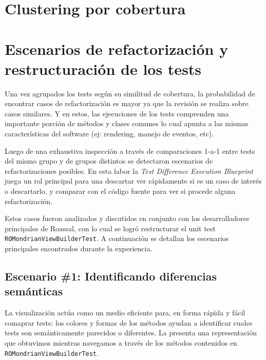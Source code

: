 \par 
{}

\section{Clustering por cobertura}

\par 

\section{Escenarios de refactorización y restructuración de los tests}

\par Una vez agrupados los tests según su similitud de cobertura, la probabilidad de encontrar casos de refactorización es mayor ya que la revisión se realiza sobre casos similares. Y en estos, las ejecuciones de los tests comprenden una importante porción de métodos y clases comunes lo cual apunta a las mismas características del software (ej: rendering, manejo de eventos, etc). 

\par Luego de una exhaustiva inspección a través de comparaciones 1-a-1 entre tests del mismo grupo y de grupos distintos se detectaron escenarios de refactorizaciones posibles. En esta labor la \emph{Test Difference Execution Blueprint} juega un rol principal para una descartar ver rápidamente si es un caso de interés o descartarlo, y comparar con el código fuente para ver si procede alguna refactorización.

\par Estos casos fueron analizados y discutidos en conjunto con los desarrolladores principales de Roassal, con lo cual se logró restructurar el unit test {\tt ROMondrianViewBuilderTest}. A continuación se detallan los escenarios principales encontrados durante la experiencia.

\subsection{Escenario \#1: Identificando diferencias semánticas}

\par La visualización actúa como un medio eficiente para, en forma rápida y fácil comaprar tests: los colores y formas de los métodos ayudan a identificar cuales tests son semánticamente parecidos o diferentes.
La  presenta una representación que obtuvimos mientras navegamos a través de los métodos contenidos en {\tt ROMondrianViewBuilderTest}. 

